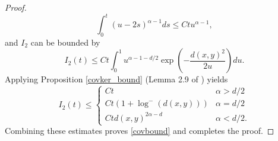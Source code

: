 \documentclass[12pt]{amsart}
\numberwithin{equation}{section}
\newcommand{\1}{\mathbf{1}}
\begin{document}
\begin{proof}
\begin{equation*}
     \int_{0}^{t}(u-2s)^{\alpha-1}ds\leq Ctu^{\alpha-1},
 \end{equation*}
and $I_2$ can be bounded by
\begin{equation*}
    I_2(t)\leq Ct\int_0^{1}u^{\alpha-1-d/2}\exp\left(-\frac{d(x,y)^2}{2u}\right)du.
\end{equation*}
    Applying Proposition \ref{covker_bound} (Lemma 2.9 of \cite{brosamler1983laws}) yields
    \begin{equation*}
        I_2(t)\leq\begin{cases}
    Ct &\alpha>d/2\\
    Ct(1+\log^-(d(x,y))) &\alpha=d/2\\
    Ct d(x,y)^{2\alpha-d} &\alpha<d/2.
\end{cases}
    \end{equation*}
Combining these estimates proves \eqref{covbound} and completes the proof.
\end{proof}
\end{document}
